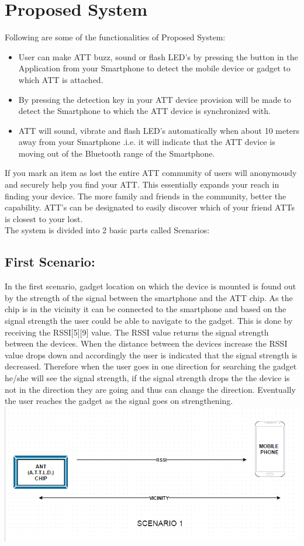 \documentclass[a4paper,10pt]{report}
\begin{document}
\chapter{Proposed System}
Following are some of the functionalities of Proposed System:
\begin{itemize}
 \item User can make ATT buzz, sound or flash LED’s by pressing the button in the Application from your Smartphone to detect the mobile device or gadget to which ATT is attached.
 \item By pressing the detection key in your ATT device provision will be made to detect the Smartphone to which the ATT device is synchronized with.
 \item ATT will sound, vibrate and flash LED’s automatically when about 10 meters away from your Smartphone .i.e. it will indicate that the ATT device is moving out of the Bluetooth range of the Smartphone.
\end{itemize}
If you mark an item as lost the entire ATT community of users will anonymously and securely help you find your ATT. This essentially expands your reach in finding your device. The more family and friends in the community, better the capability. ATT’s can be designated to easily discover which of your friend ATTs is closest to your lost.\\
\newpage
The system is divided into 2 basic parts called Scenarios:
\section{First Scenario:}
In the first scenario, gadget location on which the device is mounted is found out by the strength of the signal between the smartphone and the ATT chip. As the chip is in the vicinity it can be connected to the smartphone and based on the signal strength the user could be able to navigate to the gadget. This is done by receiving the RSSI[5][9] value. The RSSI value returns the signal strength between the devices. When the distance between the devices increase the RSSI value drops down and accordingly the user is indicated that the signal strength is decreased. Therefore when the user goes in one direction for searching the gadget he/she will see the signal strength, if the signal strength drops the the device is not in the direction they are going and thus can change the direction. Eventually the user reaches the gadget as the signal goes on strengthening.\\[0.3in]
\includegraphics[scale=0.7]{images/scenea}
\newpage
\end{document}
